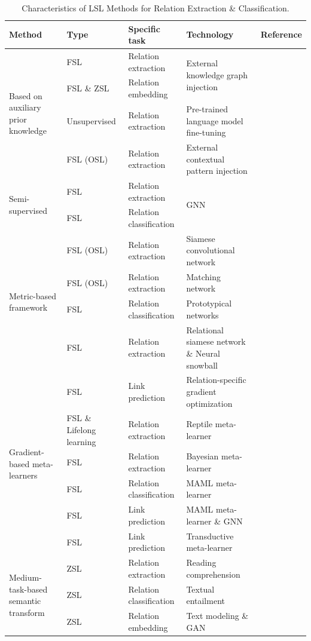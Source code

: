 \begin{table}[t]
\centering
\footnotesize
\caption{Characteristics of LSL Methods for Relation Extraction \& Classification.}
\label{tab4-1-2-1}
\begin{tabular}{p{50pt}|p{50pt}|p{70pt}|p{80pt}|p{80pt}}
\hline
Method & Type & Specific task & Technology & Reference \\
\hline
\multirow{4}{50pt}[-10pt]{Based on auxiliary prior knowledge} & FSL & Relation extraction & \multirow{2}{80pt}{External knowledge graph injection} &  \\
\cline{2-3} \cline{5-5}
 & FSL \& ZSL & Relation embedding &  &  \\
\cline{2-5}
 & Unsupervised & Relation extraction & Pre-trained language model fine-tuning &  \\
\cline{2-5}
 & FSL (OSL) & Relation extraction & External contextual pattern injection &  \\
\hline
\multirow{2}{50pt}{Semi-supervised} & FSL & Relation extraction & \multirow{2}{80pt}{GNN} &  \\
\cline{2-3} \cline{5-5}
 & FSL & Relation classification &  &  \\
\hline
\multirow{4}{50pt}[-20pt]{Metric-based framework} & FSL (OSL) & Relation extraction &  Siamese convolutional network &  \\
\cline{2-5}
 & FSL (OSL) & Relation extraction & Matching network &  \\
\cline{2-5}
 & FSL & Relation classification & Prototypical networks &  \\
\cline{2-5}
 & FSL & Relation extraction & Relational siamese network \& Neural snowball &  \\
\hline
\multirow{6}{50pt}[-25pt]{Gradient-based meta-learners} & FSL & Link prediction & Relation-specific gradient optimization &  \\
\cline{2-5}
 & FSL \& Lifelong learning & Relation extraction & Reptile meta-learner &  \\
\cline{2-5}
 & FSL & Relation extraction & Bayesian meta-learner &  \\
\cline{2-5}
 & FSL & Relation classification & MAML meta-learner &  \\
\cline{2-5}
 & FSL & Link prediction & MAML meta-learner \& GNN &  \\
\cline{2-5}
 & FSL & Link prediction & Transductive meta-learner &  \\
\hline
\multirow{3}{50pt}[-5pt]{Medium-task-based semantic transform} & ZSL & Relation extraction & Reading comprehension &  \\
\cline{2-5}
 & ZSL & Relation classification & Textual entailment &  \\
\cline{2-5}
 & ZSL & Relation embedding & Text modeling \& GAN &  \\
\hline
\end{tabular}
\end{table}
